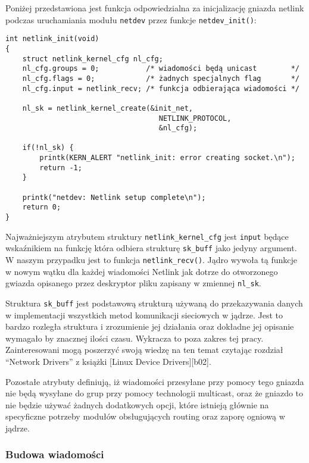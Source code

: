 Poniżej przedstawiona jest funkcja odpowiedzialna za inicjalizację
gniazda netlink podczas uruchamiania modułu \texttt{netdev} przez
funkcje \texttt{netdev\_init()}:

\begin{verbatim}
int netlink_init(void)
{
    struct netlink_kernel_cfg nl_cfg;
    nl_cfg.groups = 0;           /* wiadomości będą unicast        */
    nl_cfg.flags = 0;            /* żadnych specjalnych flag       */
    nl_cfg.input = netlink_recv; /* funkcja odbierająca wiadomości */

    nl_sk = netlink_kernel_create(&init_net,
                                    NETLINK_PROTOCOL,
                                    &nl_cfg);

    if(!nl_sk) {
        printk(KERN_ALERT "netlink_init: error creating socket.\n");
        return -1;
    }

    printk("netdev: Netlink setup complete\n");
    return 0;
}
\end{verbatim}

Najważniejszym atrybutem struktury \texttt{netlink\_kernel\_cfg} jest
\texttt{input} będące wskaźnikiem na funkcję która odbiera strukturę
\texttt{sk\_buff} jako jedyny argument. W naszym przypadku jest to
funkcja \texttt{netlink\_recv()}. Jądro wywoła tą funkcje w nowym wątku
dla każdej wiadomości Netlink jak dotrze do otworzonego gwiazda
opisanego przez deskryptor pliku zapisany w zmiennej \texttt{nl\_sk}.

Struktura \texttt{sk\_buff} jest podstawową strukturą używaną do
przekazywania danych w implementacji wszystkich metod komunikacji
sieciowych w jądrze. Jest to bardzo rozległa struktura i zrozumienie jej
działania oraz dokładne jej opisanie wymagało by znacznej ilości czasu.
Wykracza to poza zakres tej pracy. Zainteresowani mogą poszerzyć swoją
wiedzę na ten temat czytając rozdział ``Network Drivers'' z książki
{[}Linux Device Drivers{]}{[}b02{]}.

Pozostałe atrybuty definiują, iż wiadomości przesyłane przy pomocy tego
gniazda nie będą wysyłane do grup przy pomocy technologii multicast,
oraz że gniazdo to nie będzie używać żadnych dodatkowych opcji, które
istnieją głównie na specyficzne potrzeby modułów obsługujących routing
oraz zaporę ogniową w jądrze.

\subsubsection{Budowa wiadomości}

